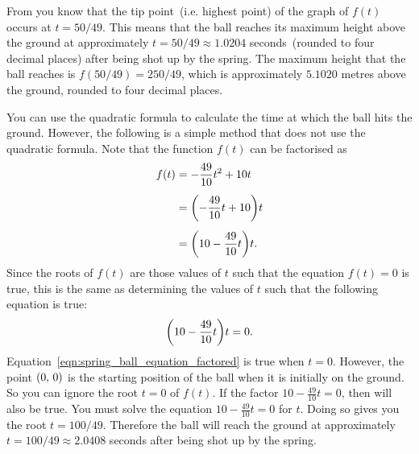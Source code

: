\documentclass[a4paper,oneside,12pt]{article}
\begin{document}
\begin{solution}
From  you know that the tip
point~(i.e. highest point) of the graph of $f(t)$ occurs at
$t = 50/49$.  This means that the ball reaches its maximum height
above the ground at approximately $t = 50/49 \approx 1.0204$
seconds~(rounded to four decimal places) after being shot up by the
spring.  The maximum height that the ball reaches is
$f(50 / 49) = 250 / 49$, which is approximately $5.1020$ metres above
the ground, rounded to four decimal places.

You can use the quadratic formula to calculate the time at which the
ball hits the ground.  However, the following is a simple method that
does not use the quadratic formula.  Note that the function $f(t)$ can
be factorised as
\begin{align*}
f(t)
&=
-\frac{49}{10} t^2 + 10t \\[4pt]
&=
\parenthesis*{-\frac{49}{10} t + 10} t \\[4pt]
&=
\parenthesis*{10 - \frac{49}{10} t} t.
\end{align*}
Since the roots of $f(t)$ are those values of $t$ such that the
equation $f(t) = 0$ is true, this is the same as determining the
values of $t$ such that the following equation is true:
\begin{equation}
\label{eqn:spring_ball_equation_factored}
\parenthesis*{10 - \frac{49}{10} t} t
=
0.
\end{equation}
Equation~\eqref{eqn:spring_ball_equation_factored} is true when
$t = 0$.  However, the point $\left\lparen{0},\, {0}\right\rparen$ is the starting position
of the ball when it is initially on the ground.  So you can ignore the
root $t = 0$ of $f(t)$.  If the factor $10 - \frac{49}{10} t = 0$,
then  will also be true.
You must solve the equation $10 - \frac{49}{10} t = 0$ for $t$.  Doing
so gives you the root $t = 100 / 49$.  Therefore the ball will reach
the ground at approximately $t = 100 / 49 \approx 2.0408$ seconds
after being shot up by the spring.
\end{solution}
\end{document}
